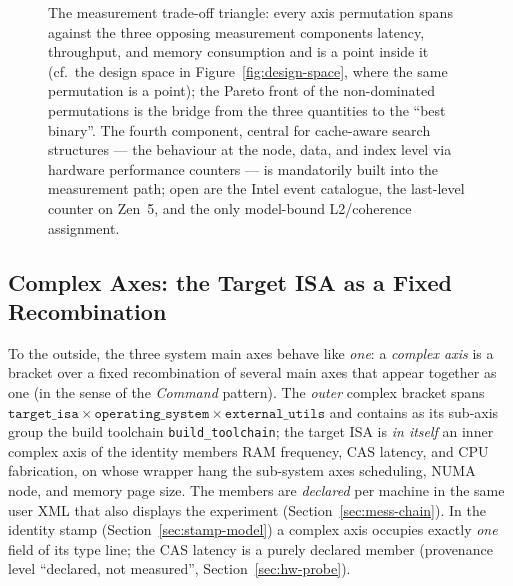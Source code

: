 \begin{nurkurz}
\begin{figure}[htbp]
\caption{The measurement trade-off triangle: every axis permutation spans against the three opposing
measurement components latency, throughput, and memory consumption and is a point inside it (cf.\ the
design space in Figure~\ref{fig:design-space}, where the same permutation is a point); the Pareto front
of the non-dominated permutations is the bridge from the three quantities to the \enquote{best binary}. The fourth component,
central for cache-aware search structures --- the behaviour at the node, data, and
index level via hardware performance counters --- is mandatorily built into the measurement path; open are the
Intel event catalogue, the last-level counter on Zen~5, and the only model-bound L2/coherence assignment.}\label{fig:measurement-triangle}
\end{figure}
\subsection{Complex Axes: the Target ISA as a Fixed Recombination}\label{sec:complex-axis}
To the outside, the three system main axes behave like \emph{one}: a \emph{complex axis} is a bracket
over a fixed recombination of several main axes that appear together as one (in the sense of the
\emph{Command} pattern). The \emph{outer} complex bracket spans
$\texttt{target\_isa} \times \texttt{operating\_system} \times \texttt{external\_utils}$ and contains
as its sub-axis group the build toolchain \texttt{build\_toolchain}; the target ISA is \emph{in itself}
an inner complex axis of the identity members RAM frequency, CAS latency, and CPU fabrication, on whose
wrapper hang the sub-system axes scheduling, NUMA node, and memory page size. The members are
\emph{declared} per machine in the same user XML that also displays the experiment
(Section~\ref{sec:mess-chain}). In the identity stamp (Section~\ref{sec:stamp-model}) a complex axis
occupies exactly \emph{one} field of its type line; the CAS latency is a purely declared member
(provenance level \enquote{declared, not measured}, Section~\ref{sec:hw-probe}).

\end{nurkurz}
